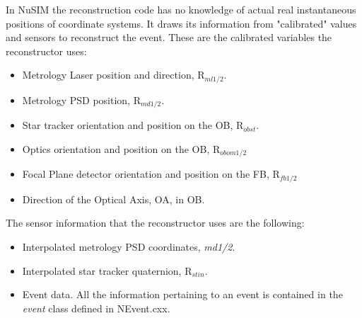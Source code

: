 \documentclass[11pt]{article}
\begin{document}
In NuSIM the reconstruction code has no knowledge of actual real instantaneous positions of coordinate systems. It draws its information from "calibrated" values and sensors to reconstruct the event. These are the calibrated variables the reconstructor uses:
\begin{itemize}
\item Metrology Laser position and direction, R$_{ml1/2}$.
\item Metrology PSD position, R$_{md1/2}$.
\item Star tracker orientation and position on the OB, R$_{obst}$.
\item Optics orientation and position on the OB, R$_{obom1/2}$
\item Focal Plane detector orientation and position on the FB, R$_{fb1/2}$
\item Direction of the Optical Axis, OA, in OB.
\end{itemize}
The sensor information that the reconstructor uses are the following:
\begin{itemize}
\item Interpolated metrology PSD coordinates, \textit{md1/2}.
\item Interpolated star tracker quaternion, R$_{stin}$.
\item Event data. All the information pertaining to an event is contained in the \textit{event} class defined in NEvent.cxx.
\end{itemize}
\end{document}
